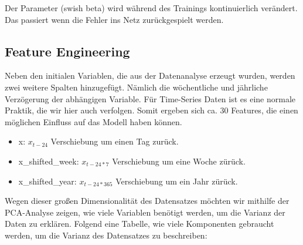 \documentclass[11pt,ngerman,a4paper,]{article}
\providecommand{\tightlist}{%
  \setlength{\itemsep}{0pt}\setlength{\parskip}{0pt}}
\begin{document}
Der Parameter (swish beta) wird während des Trainings kontinuierlich verändert. Das passiert wenn die Fehler ins Netz zurückgespielt werden.

\clearpage
\newpage

\subsection{Feature Engineering}\label{feature-engineering}

Neben den initialen Variablen, die aus der Datenanalyse erzeugt wurden, werden zwei weitere Spalten hinzugefügt. Nämlich die wöchentliche und jährliche Verzögerung der abhängigen Variable. Für Time-Series Daten ist es eine normale Praktik, die wir hier auch verfolgen. Somit ergeben sich ca. 30 Features, die einen möglichen Einfluss auf das Modell haben können.

\begin{itemize}
\tightlist
\item
  x: \(x_{t-24}\) Verschiebung um einen Tag zurück.
\item
  x\_shifted\_week: \(x_{t-24*7}\) Verschiebung um eine Woche zürück.
\item
  x\_shifted\_year: \(x_{t-24*365}\) Verschiebung um ein Jahr zürück.
\end{itemize}

Wegen dieser großen Dimensionalität des Datensatzes möchten wir mithilfe der PCA-Analyse zeigen, wie viele Variablen benötigt werden, um die Varianz der Daten zu erklären. Folgend eine Tabelle, wie viele Komponenten gebraucht werden, um die Varianz des Datensatzes zu beschreiben:
\end{document}
